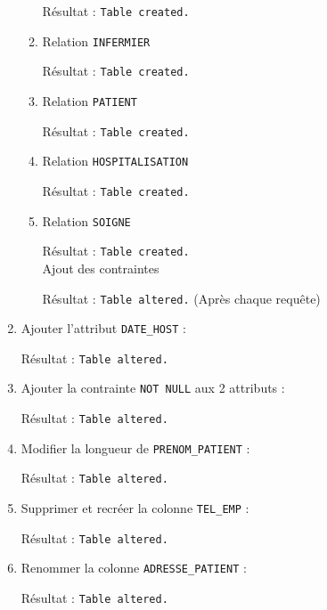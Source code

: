 \documentclass[12pt,a4paper]{article}
\begin{document}
\begin{enumerate}
\begin{enumerate}
					
						Résultat : \texttt{Table created.}
				\item Relation \texttt{INFERMIER}
					
						Résultat : \texttt{Table created.}
				\item Relation \texttt{PATIENT}
					
						Résultat : \texttt{Table created.}
				\item Relation \texttt{HOSPITALISATION}
					
						Résultat : \texttt{Table created.}
				\item Relation \texttt{SOIGNE}
					
						Résultat : \texttt{Table created.}\\
				Ajout des contraintes
				
				Résultat : \texttt{Table altered.} (Après chaque requête)
			\end{enumerate}
		\item Ajouter l'attribut \texttt{DATE\_HOST} :
		
		Résultat : \texttt{Table altered.}
		\item Ajouter la contrainte \texttt{NOT NULL} aux 2 attributs :
		
		Résultat : \texttt{Table altered.}
		\item Modifier la longueur de \texttt{PRENOM\_PATIENT} :
		
		Résultat : \texttt{Table altered.}
		\item Supprimer et recréer la colonne \texttt{TEL\_EMP} :
		
		Résultat : \texttt{Table altered.}
		\item Renommer la colonne \texttt{ADRESSE\_PATIENT} :
		
		Résultat : \texttt{Table altered.}
	\end{enumerate}
\end{document}
